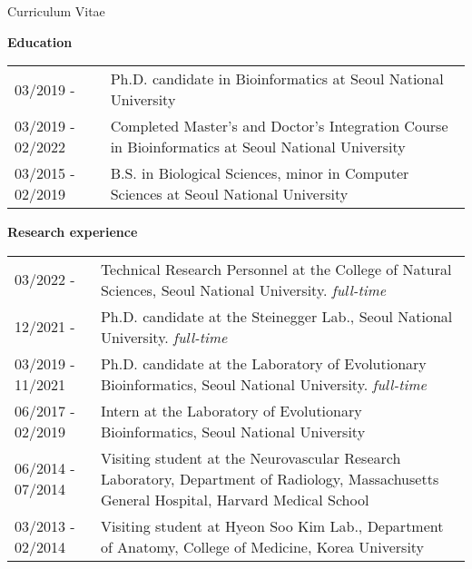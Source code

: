 \documentclass{resume} %
\begin{document}


\setcounter{tocdepth}{1}

\pagestyle{plain}
\setcounter{page}{1}

\setlength{\oddsidemargin}{-0.2cm}
\setlength{\evensidemargin}{-0.2cm}
\setlength{\linewidth}{16.5cm}
\setlength{\textheight}{26cm}
\setlength{\tabcolsep}{0cm}


\begin{rSection}{Curriculum Vitae}
\vspace{2mm}

{\bf Education}\vspace{1mm}

\begin{tabular}{p{3.6cm}p{13.0cm}}
03/2019 - & Ph.D. candidate in Bioinformatics at Seoul National University
\\[1.mm]
03/2019 - 02/2022 & Completed Master's and Doctor's Integration Course in Bioinformatics at Seoul National University
\\[1.mm]
03/2015 - 02/2019 & B.S. in Biological Sciences, minor in Computer Sciences at Seoul National University 
\\[1mm]
\end{tabular}
\vspace{1mm}

{\bf Research experience}\vspace{1mm}

\begin{tabular}{p{3.6cm}p{13.0cm}}
03/2022 - & Technical Research Personnel at the College of Natural Sciences, Seoul National University. \textit{full-time}
\\[1.mm]
12/2021 - & Ph.D. candidate at the Steinegger Lab., Seoul National University. \textit{full-time}
\\[1.mm]
03/2019 - 11/2021 & Ph.D. candidate at the Laboratory of Evolutionary Bioinformatics, Seoul National University. \textit{full-time}
\\[1.mm]
06/2017 - 02/2019 & Intern at the Laboratory of Evolutionary Bioinformatics, Seoul National University
\\[1.mm]
06/2014 - 07/2014 & Visiting student at the Neurovascular Research Laboratory, Department of Radiology, Massachusetts General Hospital, Harvard Medical School
\\[1.mm]
03/2013 - 02/2014 & Visiting student at Hyeon Soo Kim Lab., Department of Anatomy, College of Medicine, Korea University
\\[1.mm]
\end{tabular}
\vspace{1mm}
\end{rSection}
\end{document}
